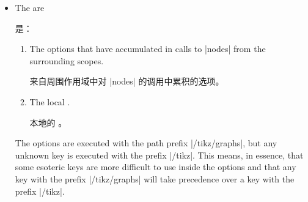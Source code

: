 \begin{itemize}
\begin{key}{/tikz/graphs/name=}
            请注意，实际上，在上面的示例中创建了六个节点，即使第一组和第二组节点具有相同的。原因是六个节点的完整名称都是不同的。还请注意，只有被用作节点文本，而不是完整名称。稍后可以根据需要进行更改。

            This key can be used repeatedly, leading to ever longer node names.

            此关键字可以重复使用，从而得到越来越长的节点名称。
        \end{key}

        \begin{key}{/tikz/graphs/name separator= (initially \string\space)}
            Changes the symbol that is used to separate the  from
            the . The default is |\space|, resulting in a
            space.
            
            更改用于将与分隔的符号。默认值为|\space|，即空格。
\begin{codeexample}[preamble={\usetikzlibrary{graphs}}]
\end{codeexample}
\begin{codeexample}[preamble={\usetikzlibrary{graphs}}]
\end{codeexample}
        \end{key}
    \item The  are

     是：
        \begin{enumerate}
            \item The options that have accumulated in calls to |nodes| from
                the surrounding scopes.

                来自周围作用域中对 |nodes| 的调用中累积的选项。
            \item The local .

            本地的 。
        \end{enumerate}
        The options are executed with the path prefix |/tikz/graphs|, but any
        unknown key is executed with the prefix |/tikz|. This means, in
        essence, that some esoteric keys are more difficult to use inside the
        options and that any key with the prefix |/tikz/graphs| will take
        precedence over a key with the prefix |/tikz|.


\end{itemize}
